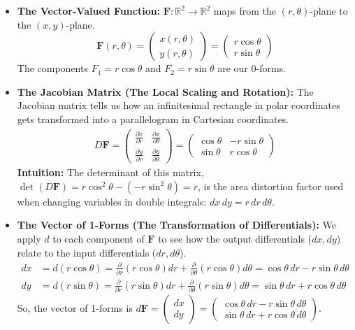 \documentclass[12pt, letterpaper]{article}
\theoremstyle{definition}
\begin{document}
	\begin{itemize}
		\item \textbf{The Vector-Valued Function:} $\mathbf{F}: \mathbb{R}^2 \to \mathbb{R}^2$ maps from the $(r, \theta)$-plane to the $(x, y)$-plane.
		\begin{equation*}
			\mathbf{F}(r, \theta) = \begin{pmatrix} x(r, \theta) \\ y(r, \theta) \end{pmatrix} = \begin{pmatrix} r\cos\theta \\ r\sin\theta \end{pmatrix}
		\end{equation*}
		The components $F_1 = r\cos\theta$ and $F_2 = r\sin\theta$ are our 0-forms.
		
		\item \textbf{The Jacobian Matrix (The Local Scaling and Rotation):} The Jacobian matrix tells us how an infinitesimal rectangle in polar coordinates gets transformed into a parallelogram in Cartesian coordinates.
		\begin{align*}
			D\mathbf{F} = \begin{pmatrix} \frac{\partial x}{\partial r} & \frac{\partial x}{\partial \theta} \\ \frac{\partial y}{\partial r} & \frac{\partial y}{\partial \theta} \end{pmatrix}
			= \begin{pmatrix} \cos\theta & -r\sin\theta \\ \sin\theta & r\cos\theta \end{pmatrix}
		\end{align*}
		\textbf{Intuition:} The determinant of this matrix, $\det(D\mathbf{F}) = r\cos^2\theta - (-r\sin^2\theta) = r$, is the area distortion factor used when changing variables in double integrals: $dx\,dy = r\,dr\,d\theta$.
		
		\item \textbf{The Vector of 1-Forms (The Transformation of Differentials):} We apply $d$ to each component of $\mathbf{F}$ to see how the output differentials ($dx, dy$) relate to the input differentials ($dr, d\theta$).
		\begin{align*}
			dx &= d(r\cos\theta) = \frac{\partial}{\partial r}(r\cos\theta)dr + \frac{\partial}{\partial \theta}(r\cos\theta)d\theta = \cos\theta \, dr - r\sin\theta \, d\theta \\
			dy &= d(r\sin\theta) = \frac{\partial}{\partial r}(r\sin\theta)dr + \frac{\partial}{\partial \theta}(r\sin\theta)d\theta = \sin\theta \, dr + r\cos\theta \, d\theta
		\end{align*}
		So, the vector of 1-forms is $d\mathbf{F} = \begin{pmatrix} dx \\ dy \end{pmatrix} = \begin{pmatrix} \cos\theta \, dr - r\sin\theta \, d\theta \\ \sin\theta \, dr + r\cos\theta \, d\theta \end{pmatrix}$.
		

\end{itemize}
\end{document}
